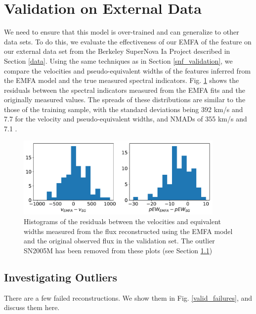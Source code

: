 \section{Validation on External Data}
We need to ensure that this model is over-trained and can generalize to other data sets. To do this, we evaluate the effectiveness of our EMFA of the feature on our external data set from the Berkeley SuperNova Ia Project \citep[BSNIP,][]{silverman_berkeley_2012} described in Section \ref{data}. Using the same techniques as in Section \ref{snf_validation}, we compare the velocities and pseudo-equivalent widths of the features inferred from the EMFA model and the true measured spectral indicators. Fig. \ref{bsnip_hist_resids} shows the residuals between the spectral indicators measured from the EMFA fits and the originally measured values. The spreads of these distributions are similar to the those of the training sample, with the standard deviations being 392 km/s and 7.7 \angstrom\; for the velocity and pseudo-equivalent widths, and NMADs of 355 km/s and 7.1 \angstrom.

\begin{figure}[!htb]
    \centering
    \includegraphics[width=0.9\textwidth]{figures/si_feat_pca/bsnip_recovery_resids.pdf}
    \caption{Histograms of the residuals between the velocities and equivalent widths measured from the flux reconstructed using the EMFA model and the original observed flux in the validation set. The outlier SN2005M has been removed from these plots (see Section \ref{outliers})}
    \label{bsnip_hist_resids}
\end{figure}

\subsection{Investigating Outliers}
\label{outliers}
There are a few failed reconstructions. We show them in Fig. \ref{valid_failures}, and discuss them here.

